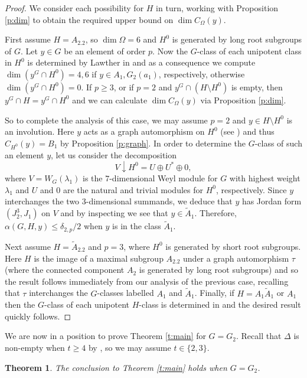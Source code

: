 \documentclass[twoside,a4paper,reqno,11pt]{amsart}
\renewcommand{\a}{\alpha}
\renewcommand{\l}{\lambda}
\renewcommand{\O}{\Omega}
\newcommand{\<}{\langle}
\renewcommand{\>}{\rangle}
\newcommand{\leqs}{\leqslant}
\newcommand{\geqs}{\geqslant}
\renewcommand{\:}{\colon}
\theoremstyle{plain}
\newtheorem{thm}{Theorem}[section]
\theoremstyle{definition}
\begin{document}
\begin{proof}
We consider each possibility for $H$ in turn, working with Proposition \ref{p:dim} to obtain the required upper bound on $\dim C_{\O}(y)$.

First assume $H = A_2.2$, so $\dim \O = 6$ and $H^0$ is generated by long root subgroups of $G$. Let $y \in G$ be an element of order $p$. Now the $G$-class of each unipotent class in $H^0$ is determined by Lawther in \cite[Section 4.2]{Law2} and as a consequence we compute $\dim(y^G \cap H^0) = 4,6$ if $y \in A_1, G_2(a_1)$, respectively, otherwise $\dim(y^G \cap H^0)=0$. If $p \geqs 3$, or if $p = 2$ and $y^G \cap (H \setminus H^0)$ is empty, then $y^G \cap H = y^G \cap H^0$  and we can calculate $\dim C_{\O}(y)$ via Proposition \ref{p:dim}. 

So to complete the analysis of this case, we may assume $p=2$ and $y \in H \setminus H^0$ is an involution. Here $y$ acts as a graph automorphism on $H^0$ (see \cite[p.3]{LS04}) and thus $C_{H^0}(y) = B_1$ by Proposition \ref{p:graph}. In order to determine the $G$-class of such an element $y$, let us consider the decomposition 
\[
V\downarrow H^0 = U \oplus U^* \oplus 0,
\]
where $V = W_G(\l_1)$ is the $7$-dimensional Weyl module for $G$ with highest weight $\l_1$ and $U$ and $0$ are the natural and trivial modules for $H^0$, respectively. Since $y$ interchanges the two $3$-dimensional summands, we deduce that $y$ has Jordan form $(J_2^3,J_1)$ on $V$ and by  inspecting \cite[Table 1]{Law1} we see that $y \in \tilde{A}_1$. Therefore, $\a(G,H,y) \leqs \delta_{2,p}/2$ when $y$ is in the class $\tilde{A}_1$.

Next assume $H = \tilde{A}_2.2$ and $p=3$, where $H^0$ is generated by short root subgroups. Here $H$ is the image of a maximal subgroup $A_2.2$ under a graph automorphism $\tau$ (where the connected component $A_2$ is generated by long root subgroups) and so the result follows immediately from our analysis of the previous case, recalling that $\tau$ interchanges the $G$-classes labelled $A_1$ and $\tilde{A}_1$. 
Finally, if $H = A_1\tilde{A}_1$ or $A_1$ then the $G$-class of each unipotent $H$-class is determined in \cite{Law2} and the desired result quickly follows.
\end{proof}

We are now in a position to prove Theorem \ref{t:main} for $G = G_2$. Recall that $\Delta$ is non-empty when $t \geqs 4$ by \cite[Theorem 7]{BGG1}, so we may assume $t \in \{2,3\}$.

\begin{thm}\label{t:g2}
The conclusion to Theorem \ref{t:main} holds when $G = G_2$. 
\end{thm}
\end{document}
